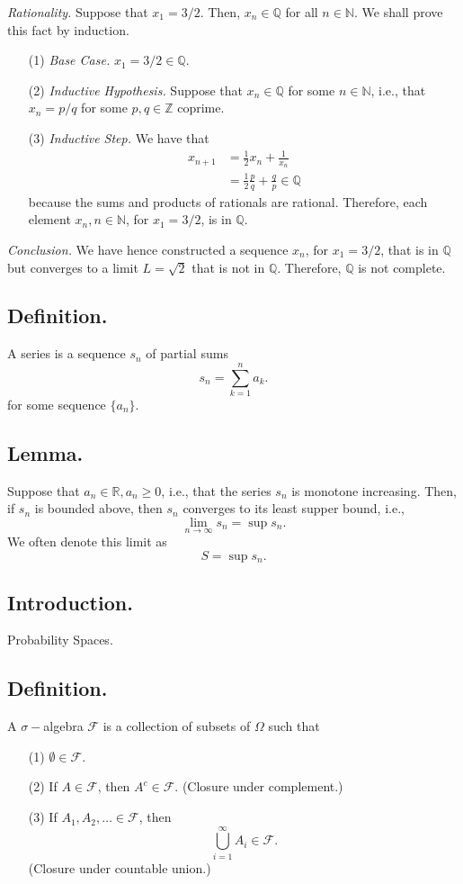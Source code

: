 \documentclass[titlepage]{article}
\begin{document}
\textit{Rationality.} Suppose that $x_{1} = 3/2$. Then, $x_{n} \in \mathbb{Q}$ for all $n \in \mathbb{N}$. We shall prove this fact by induction. 
\begin{enumerate}
\item[(1)] \textit{Base Case.} $x_{1} = 3/2 \in \mathbb{Q}$.
\item[(2)] \textit{Inductive Hypothesis.} Suppose that $x_{n} \in \mathbb{Q}$ for some $n \in \mathbb{N}$, i.e., that $x_{n} = p/q$ for some $p,q \in \mathbb{Z}$ coprime.
\item[(3)] \textit{Inductive Step.} We have that 
\begin{align*}
    x_{n+1} &= \frac{1}{2}x_{n} + \frac{1}{x_{n}} \\
            &= \frac{1}{2}\frac{p}{q} + \frac{q}{p} \in \mathbb{Q}
\end{align*}
because the sums and products of rationals are rational. Therefore, each element $x_{n}, n \in \mathbb{N}$, for 
$x_{1} = 3/2$, is in $\mathbb{Q}$.
\end{enumerate}

\textit{Conclusion.} We have hence constructed a sequence $x_{n}$, for $x_{1} = 3/2$, that is in $\mathbb{Q}$ but converges to a limit $L = \sqrt{2}$ that is not in $\mathbb{Q}$. Therefore, $\mathbb{Q}$ is not complete.

\subsection{Definition.} A series is a sequence $s_{n}$ of partial sums 
$$s_{n} = \sum_{k=1}^{n}a_{k}.$$
for some sequence $\{a_{n}\}$.

\subsection{Lemma.} Suppose that $a_{n} \in \mathbb{R}, a_{n} \geq 0$, i.e., that the series $s_{n}$ is monotone increasing. Then, if $s_{n}$ is bounded above, then $s_{n}$ converges to its least supper bound, i.e., 
$$\lim_{n \to \infty}s_{n} = \sup s_{n}.$$
We often denote this limit as 
$$S = \sup s_{n}.$$

\newpage {}

\subsection{Introduction.} Probability Spaces.

\subsection{Definition.} A $\sigma-$algebra $\mathcal{F}$ is a collection of subsets of $\Omega$ such that 
\begin{enumerate}
\item[(1)] $\emptyset \in \mathcal{F}$.
\item[(2)] If $A \in \mathcal{F}$, then $A^{c} \in \mathcal{F}$. (Closure under complement.)
\item[(3)] If $A_{1}, A_{2}, \ldots \in \mathcal{F}$, then 
$$\bigcup_{i=1}^{\infty}A_{i} \in \mathcal{F}.$$
(Closure under countable union.)
\end{enumerate}
\end{document}
